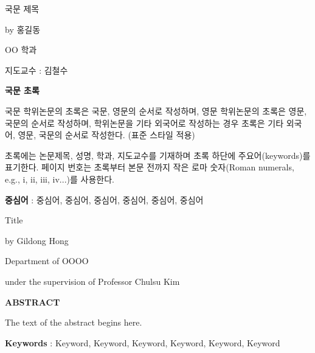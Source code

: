 \documentclass{report}
\begin{document}
\newpage 
\begin{center}
\LARGE 국문 제목 %
\par\vspace{20pt}
\normalsize by 홍길동\par %
OO 학과\par %
지도교수 : 김철수
\par\vspace{20pt}
\large \textbf{국문 초록}
\end{center}
\normalsize
국문 학위논문의 초록은 국문, 영문의 순서로 작성하며, 영문 학위논문의 초록은 영문, 국문의 순서로 작성하며, 학위논문을 기타 외국어로 작성하는 경우 초록은 기타 외국어, 영문, 국문의 순서로 작성한다. (표준 스타일 적용)

초록에는 논문제목, 성명, 학과, 지도교수를 기재하며 초록 하단에 주요어(keywords)를 표기한다. 
페이지 번호는 초록부터 본문 전까지 작은 로마 숫자(Roman numerals, e.g., i, ii, iii, iv...)를 사용한다.

\par\vspace{100pt}
\textbf{중심어} : 중심어, 중심어, 중심어, 중심어, 중심어, 중심어

\newpage 
{} %
\begin{center}
\LARGE Title %
\par\vspace{20pt}
\normalsize by Gildong Hong\par %
Department of OOOO\par
under the supervision of Professor Chulsu Kim %
\par\vspace{20pt}
\large \textbf{ABSTRACT}
\end{center}
\normalsize
The text of the abstract begins here. 
\par\vspace{100pt}
\textbf{Keywords} : Keyword, Keyword, Keyword, Keyword, Keyword, Keyword
\end{document}
